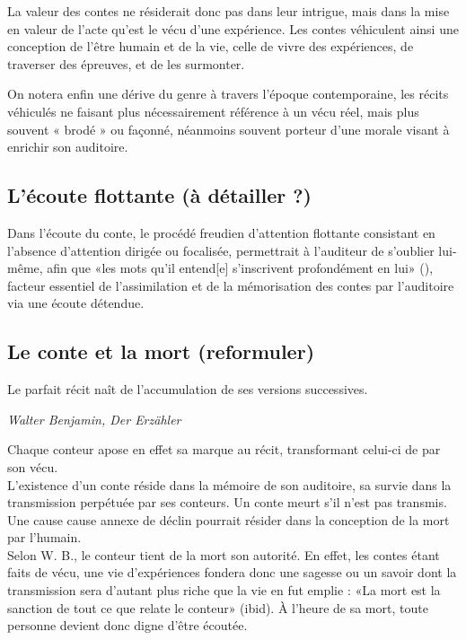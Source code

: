 La valeur des contes ne résiderait donc pas dans leur intrigue, mais dans la mise en valeur de l'acte qu'est le vécu d'une expérience. Les contes véhiculent ainsi une conception de l'être humain et de la vie, celle de vivre des expériences, de traverser des épreuves, et de les surmonter.

On notera enfin une dérive du genre à travers l'époque contemporaine, les récits véhiculés ne faisant plus nécessairement référence à un vécu réel, mais plus souvent « brodé » ou façonné, néanmoins souvent porteur d'une morale visant à enrichir son auditoire.


\subsection{L'écoute flottante (à détailler ?)}
Dans l'écoute du conte, le procédé freudien d'attention flottante consistant en l'absence d'attention dirigée ou focalisée, permettrait à l'auditeur de s'oublier lui-même, afin que «les mots qu'il entend[e] s'inscrivent profondément en lui» (\cite{benjamin1991gesammelte}), facteur essentiel de l'assimilation et de la mémorisation des contes par l'auditoire via une écoute détendue.\\

\subsection{Le conte et la mort (reformuler)}

\begin{shadequote}
Le parfait récit naît de l'accumulation de ses versions successives. \par\emph{Walter Benjamin, Der Erzähler}
\end{shadequote}

Chaque conteur apose en effet sa marque au récit, transformant celui-ci de par son vécu.\\
L'existence d'un conte réside dans la mémoire de son auditoire, sa survie dans la transmission perpétuée par ses conteurs. Un conte meurt s'il n'est pas transmis.\\
Une cause cause annexe de déclin pourrait résider dans la conception de la mort par l'humain.\\
Selon W. B., le conteur tient de la mort son autorité. En effet, les contes étant faits de vécu, une vie d'expériences fondera donc une sagesse ou un savoir dont la transmission sera d'autant plus riche que la vie en fut emplie :  «La mort est la sanction de tout ce que relate le conteur» (ibid). À l'heure de sa mort, toute personne devient donc digne d'être écoutée.\\

